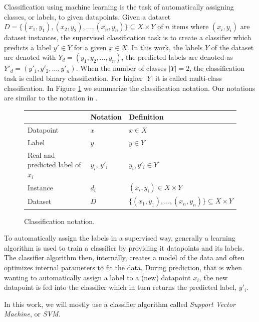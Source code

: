 Classification using machine learning is the task of automatically assigning classes, or labels, to given datapoints.
Given a dataset $D = \{(x_1, y_1), (x_2, y_2), \ldots, (x_n, y_n) \} \subseteq X \times Y$ of $n$ items where $(x_i, y_i)$ are dataset instances, the supervised classification task is to create a classifier which predicts a label $y' \in Y$ for a given $x \in X$.
In this work, the labels $Y$ of the dataset are denoted with $Y_d = (y_1, y_2, \ldots, y_n )$, the predicted labels are denoted as $Y'_d = (y'_1, y'_2, \ldots, y'_n )$.
When the number of classes $|Y| = 2$, the classification task is called binary classification. For higher $|Y|$ it is called multi-class classification.
In Figure \ref{table:classification_notation} we summarize the classification notation.
Our notations are similar to the notation in \cite[p.~11]{Bishop2006}.

\begin{figure}[htb!]
	\centering
	\begin{tabular}{lll}
		& Notation & Definition \\
		\toprule
		Datapoint & $x$ & $x \in X$
		\\
		Label & $y$ & $y \in Y$
		\\
		Real and predicted label of $x_i$ & $y_i$, $y'_i$ &  $y_i, y'_i \in Y$
		\\
		Instance & $d_i$ & $(x_i, y_i) \in X \times Y$
		\\
		Dataset & $D$ & $\{(x_1, y_1), \ldots, (x_n, y_n) \} \subseteq X \times Y$ 
	\end{tabular}
	\caption[Notation: Classification]{Classification notation.}\label{table:classification_notation}
\end{figure}

To automatically assign the labels in a supervised way, generally a learning algorithm is used to train a classifier by providing it datapoints and its labels.
The classifier algorithm then, internally, creates a model of the data and often optimizes internal parameters to fit the data.
During prediction, that is when wanting to automatically assign a label to a (new) datapoint $x_i$, the new datapoint is fed into the classifier which in turn returns the predicted label, $y'_i$.

In this work, we will mostly use a classifier algorithm called \textit{Support Vector Machine}, or \textit{SVM}.

